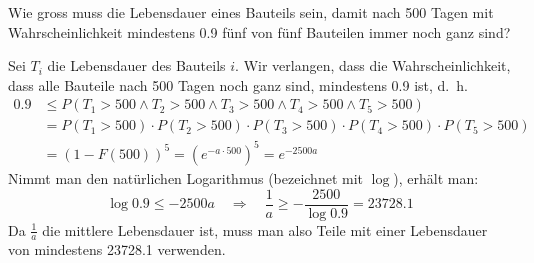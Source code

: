 Wie gross muss die Lebensdauer eines Bauteils sein, damit nach 500
Tagen mit Wahrscheinlichkeit mindestens 0.9 fünf von fünf Bauteilen
immer noch ganz sind?

\begin{loesung}
Sei $T_i$ die Lebensdauer des Bauteils $i$. Wir verlangen, dass
die Wahrscheinlichkeit, dass alle Bauteile nach 500 Tagen noch
ganz sind, mindestens 0.9 ist, d.~h.
\begin{align*}
0.9
&\le
P(
T_1 > 500
\wedge
T_2 > 500
\wedge
T_3 > 500
\wedge
T_4 > 500
\wedge
T_5 > 500)
\\
&=
P(T_1 > 500)
\cdot
P(T_2 > 500)
\cdot
P(T_3 > 500)
\cdot
P(T_4 > 500)
\cdot
P(T_5 > 500)
\\
&=(1-F(500))^5=(e^{-a\cdot 500})^5=e^{-2500a}
\end{align*}
Nimmt man den natürlichen Logarithmus (bezeichnet mit $\log$),
erhält man:
\[
\log 0.9\le -2500 a\quad\Rightarrow\quad \frac1a \ge -\frac{2500}{\log 0.9}
=23728.1
\]
Da $\frac1a$ die mittlere Lebensdauer ist, muss man also Teile mit
einer Lebensdauer von mindestens 23728.1 verwenden.
\end{loesung}

